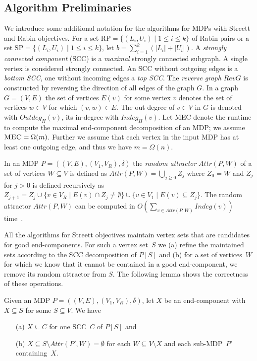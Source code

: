\documentclass[11pt,letterpaper]{article}
\newcommand{\set}[1]{\{#1\}}
\newcommand{\lu}{\textup{(}}
\newcommand{\ru}{\textup{)}\xspace}
\newcommand{\upbr}[1]{\lu #1\ru}
\newcommand{\at}{\mathit{Attr}}
\newcommand{\SP}{\mathrm{SP}}
\renewcommand{\RP}{\mathrm{RP}}
\newcommand{\mdp}{P\xspace}
\newcommand{\vo}{V_1\xspace}
\newcommand{\vr}{V_R\xspace}
\newcommand{\trans}{\delta\xspace}
\newcommand{\ec}{X\xspace}
\newcommand{\scc}{C\xspace}
\newcommand{\rev}{\mathit{RevG}}
\newcommand{\OutDeg}{\mathit{Outdeg}}
\newcommand{\InDeg}{\mathit{Indeg}}
\begin{document}
\subsection{Algorithm Preliminaries}\label{sec:algprelim}
We introduce some additional notation for the algorithms for MDPs with Streett 
and Rabin objectives.
For a set $\RP= \{(L_i, U_i) \mid 1 \le i \le k\}$
of Rabin pairs or a set $\SP= \{(L_i, U_i) \mid 1 \le i \le k\}$, 
let $b = \sum_{i=1}^k (\lvert L_i \rvert + \lvert U_i \rvert)$.
A \emph{strongly connected component} \upbr{SCC} is a \emph{maximal} strongly 
connected subgraph. A single vertex is considered strongly connected. An SCC without
outgoing edges is a \emph{bottom SCC}, one without incoming edges a \emph{top SCC}.
The \emph{reverse graph} $\rev$ is constructed by reversing the direction of 
all edges of the graph $G$. In a graph $G = (V, E)$ the set of vertices $E(v)$ 
for some vertex $v$ denotes the set of vertices $w \in V$ for which $(v, w) \in E$.
The out-degree of $v \in V$ in $G$ is denoted with $\OutDeg_H(v)$, its in-degree
with $\InDeg_H(v)$. Let \textsc{MEC} denote the runtime to compute the maximal 
end-component decomposition of an MDP; we assume $\textsc{MEC} = \Omega(m)$.
Further we assume that each vertex in the input MDP 
has at least one outgoing edge, and thus we have $m = \Omega(n)$.

\begin{definition}\label{def:attr}
In an MDP $\mdp = ((V, E), (\vo, \vr), \trans)$ 
the \emph{random attractor} $\at(\mdp, W)$ of a set of vertices 
$W \subseteq V$ is defined as $\at(\mdp, W) = \bigcup_{j \ge 0} Z_j$ where $Z_0 = W$ and 
$Z_j$ for $j > 0$ is defined recursively as $Z_{j+1} = Z_j \cup \set{v \in \vr 
\mid E(v) \cap Z_j \ne \emptyset} \cup \set{v \in \vo \mid E(v) \subseteq Z_j}$.
The random attractor $\at(\mdp, W)$ can be computed in $O(\sum_{v \in 
\at(\mdp, W)} \InDeg(v))$ time~\cite{Beeri80,Immerman81}.
\end{definition}

All the algorithms for Streett objectives maintain vertex sets that are 
candidates for good end-components. For such a vertex set~$S$ we (a) 
refine the maintained sets according to the SCC decomposition of $\mdp[S]$
and (b) for a set of vertices~$W$ for which we know that it cannot be contained 
in a good end-component, we remove its random attractor from $S$. The following lemma 
shows the correctness of these operations.

\begin{lemma}\label{lem:eccontained}
	Given an MDP $\mdp = ((V, E), (\vo, \vr), \trans)$, let $\ec$ be an end-component with $X \subseteq S$ for 
	some $S \subseteq V$. 
	We have 
	
	\begin{itemize}
	 \item[\upbr{a}]$\ec \subseteq \scc$ for one SCC~$\scc$ of $\mdp[S]$ and
	 
	 \item[\upbr{b}] $\ec \subseteq S \setminus \at(\mdp', W) = \emptyset$ for each $W \subseteq V \setminus \ec$
			 and each sub-MDP~$\mdp'$ containing~$\ec$.
	\end{itemize}
\end{lemma}
\end{document}
